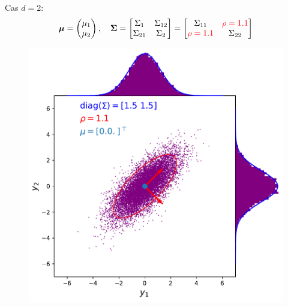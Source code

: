 \documentclass[xcolor=svgnames, t]{beamer}
\newcommand{\vectorx}[1]{\boldsymbol{\MakeLowercase{\mathbf{#1}}}}
\newcommand{\matrixx}[1]{\boldsymbol{\MakeUppercase{#1}}}
\begin{document}
\begin{frame}
  Cas $d=2$:
  \begin{equation*}
    \vectorx{\mu}
    =
    \begin{pmatrix}
      \mu_1 \\
      \mu_2
    \end{pmatrix},
    \quad
    \matrixx{\Sigma}
    =
      \begin{bmatrix}
        \Sigma_{1} & \Sigma_{12} \\
        \Sigma_{21} & \Sigma_{2}
      \end{bmatrix}
    =
      \begin{bmatrix}
        \Sigma_{11} & \color{red}\rho = 1.1 \\
        \color{red}\rho = 1.1 & \Sigma_{22}
      \end{bmatrix}
  \end{equation*}
% 
  \begin{figure}
    \includegraphics[scale=0.4]{gaussian_2d_rho_high.pdf}
  \end{figure}
\end{frame}
\end{document}
